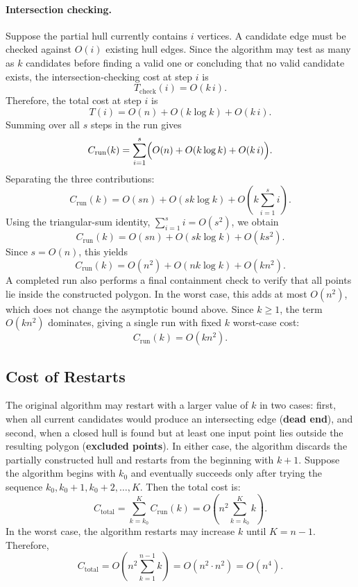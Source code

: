 \documentclass[10pt,twocolumn]{article}
\begin{document}
\paragraph{Intersection checking.}
Suppose the partial hull currently contains $i$ vertices. A candidate edge must be checked against $O(i)$ existing hull edges. Since the algorithm may test as many as $k$ candidates before finding a valid one or concluding that no valid candidate exists, the intersection-checking cost at step $i$ is
\[
T_{\mathrm{check}}(i)=O(k\,i).
\]
Therefore, the total cost at step $i$ is
\[
T(i)=O(n)+O(k\log k)+O(k\,i).
\]
Summing over all $s$ steps in the run gives
\[
C_{\mathrm{run}}(k)
=
\sum_{i=1}^{s}\Bigl(O(n)+O(k\log k)+O(k\,i)\Bigr).
\]
Separating the three contributions:
\[
C_{\mathrm{run}}(k)
=
O(sn)+O(sk\log k)+O\!\left(k\sum_{i=1}^{s} i\right).
\]
Using the triangular-sum identity, $\sum_{i=1}^{s} i = O(s^2)$, we obtain
\[
C_{\mathrm{run}}(k)=O(sn)+O(sk\log k)+O(ks^2).
\]
Since $s = O(n)$, this yields
\[
C_{\mathrm{run}}(k)=O(n^2)+O(nk\log k)+O(kn^2).
\]
A completed run also performs a final containment check to verify that all points lie inside the constructed polygon. In the worst case, this adds at most $O(n^2)$, which does not change the asymptotic bound above.
Since $k \ge 1$, the term $O(kn^2)$ dominates, giving a single run with fixed $k$ worst-case cost:
\[
\boxed{C_{\mathrm{run}}(k)=O(kn^2).}
\]
\subsection{Cost of Restarts}
The original algorithm may restart with a larger value of $k$ in two cases: first, when all current candidates would produce an intersecting edge (\textbf{dead end}), and second, when a closed hull is found but at least one input point lies outside the resulting polygon (\textbf{excluded points}). In either case, the algorithm discards the partially constructed hull and restarts from the beginning with $k+1$.
Suppose the algorithm begins with $k_0$ and eventually succeeds only after trying the sequence $k_0, k_0+1, k_0+2, \dots, K$. Then the total cost is:
\[
C_{\mathrm{total}}
=
\sum_{k=k_0}^{K} C_{\mathrm{run}}(k)
=
O\!\left(n^2 \sum_{k=k_0}^{K} k\right).
\]
In the worst case, the algorithm restarts may increase $k$ until $K=n-1$. Therefore,
\[
C_{\mathrm{total}}
=
O\!\left(n^2 \sum_{k=1}^{n-1} k\right)
= O(n^2 \cdot n^2)
= \boxed{O(n^4).}
\]
\end{document}
